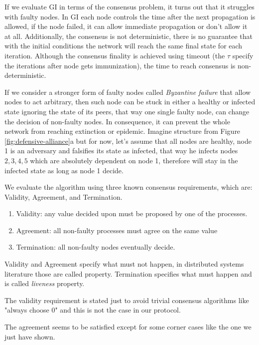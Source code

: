 \documentclass[nostrict]{szablonPG}
\begin{document}
If we evaluate GI in terms of the consensus problem, it turns out that it struggles with faulty nodes. In GI each node controls the time after the next propagation is allowed, if the node failed, it can allow immediate propagation or don't allow it at all. Additionally, the consensus is not deterministic, there is no guarantee that with the initial conditions the network will reach the same final state for each iteration. Although the consensus finality is achieved using timeout (the $\tau$ specify the iterations after node gets immunization), the time to reach consensus is non-deterministic.

If we consider a stronger form of faulty nodes called \textit{Byzantine failure}\cite{lamport2019byzantine} that allow nodes to act arbitrary, then such node can be stuck in either a healthy or infected state ignoring the state of its peers, that way one single faulty node, can change the decision of non-faulty nodes. In consequence, it can prevent the whole network from reaching extinction or epidemic. Imagine structure from Figure \ref{fig:defensive-alliance}a but for now, let's assume that all nodes are healthy, node 1 is an adversary and falsifies its state as infected, that way he infects nodes ${2,3,4,5}$ which are absolutely dependent on node 1, therefore will stay in the infected state as long as node 1 decide. 

We evaluate the algorithm using three known consensus requirements, which are: Validity, Agreement, and Termination.
\begin{enumerate}
    \item Validity: any value decided upon must be proposed by one of the processes.
    \item Agreement: all non-faulty processes must agree on the same value
    \item Termination: all non-faulty nodes eventually decide.
\end{enumerate}
Validity and Agreement specify what must not happen, in distributed systems literature\cite{lamport1977proving} those are called  property. Termination specifies what must happen and is called \textit{liveness} property.

The validity requirement is stated just to avoid trivial consensus algorithms like "always choose 0" and this is not the case in our protocol.

The agreement seems to be satisfied except for some corner cases like the one we just have shown.
\end{document}
